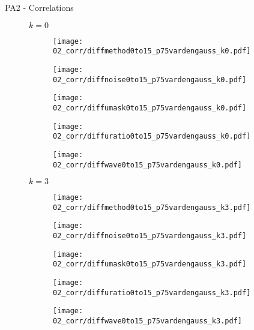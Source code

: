 \documentclass{beamer}
\begin{document}
\begin{frame}{PA2 - Correlations}{}
\begin{figure}
\centering
{\scriptsize $k=0$}\\
\begin{subfigure}{0.19\textwidth}
\texttt{[image: 02\_corr/diffmethod0to15\_p75vardengauss\_k0.pdf]}
\end{subfigure}
\begin{subfigure}{0.19\textwidth}
\texttt{[image: 02\_corr/diffnoise0to15\_p75vardengauss\_k0.pdf]}
\end{subfigure}
\begin{subfigure}{0.19\textwidth}
\texttt{[image: 02\_corr/diffumask0to15\_p75vardengauss\_k0.pdf]}
\end{subfigure}
\begin{subfigure}{0.19\textwidth}
\texttt{[image: 02\_corr/diffuratio0to15\_p75vardengauss\_k0.pdf]}
\end{subfigure}
\begin{subfigure}{0.19\textwidth}
\texttt{[image: 02\_corr/diffwave0to15\_p75vardengauss\_k0.pdf]}
\end{subfigure}

\vspace{5pt}

{\scriptsize $k=3$}\\
\begin{subfigure}{0.19\textwidth}
\texttt{[image: 02\_corr/diffmethod0to15\_p75vardengauss\_k3.pdf]}
\end{subfigure}
\begin{subfigure}{0.19\textwidth}
\texttt{[image: 02\_corr/diffnoise0to15\_p75vardengauss\_k3.pdf]}
\end{subfigure}
\begin{subfigure}{0.19\textwidth}
\texttt{[image: 02\_corr/diffumask0to15\_p75vardengauss\_k3.pdf]}
\end{subfigure}
\begin{subfigure}{0.19\textwidth}
\texttt{[image: 02\_corr/diffuratio0to15\_p75vardengauss\_k3.pdf]}
\end{subfigure}
\begin{subfigure}{0.19\textwidth}
\texttt{[image: 02\_corr/diffwave0to15\_p75vardengauss\_k3.pdf]}
\end{subfigure}
\end{figure}
\end{frame}
\end{document}
